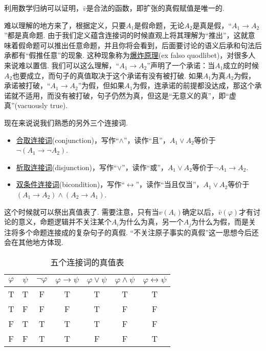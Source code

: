 \documentclass[main.tex]{subfiles}
\begin{document}
利用数学归纳可以证明，\(\bar v\)是合法的函数，即扩张的真假赋值是唯一的. 

\begin{note}
    难以理解的地方来了，根据定义，只要\(A_1\)是假命题，无论\(A_2\)是真是假，“\(A_1 \to A_2\)”都是真命题. 由于我们定义蕴含连接词的时候直观上将其理解为“推出”，这就意味着假命题可以推出任意命题，并且你将会看到，后面要讨论的语义后承和句法后承都有“假推任意”的现象. 这种现象称为\uline{爆炸原理}(ex falso quodlibet)，对很多人来说难以置信. 我们可以这么理解，“\(A_1 \to A_2\)”声明了一个承诺：当\(A_1\)成立的时候\(A_2\)也要成立，而句子的真值取决于这个承诺有没有被打破. 如果\(A_1\)为真\(A_2\)为假，承诺被打破，“\(A_1 \to A_2\)”为假，但如果\(A_1\)为假，连承诺的前提都没达成，那这个承诺就不适用，而没有被打破，句子仍然为真，但这是“无意义的真”，即“虚真”(vacuously true).
\end{note}

现在来说说我们熟悉的另外三个连接词.
\begin{itemize}
    \item \uline{合取连接词}(conjunction)，写作“\(\wedge\)”，读作“且”，\(A_1 \vee A_2\)等价于\(\neg (A_1 \to \neg A_2)\).
    \item \uline{析取连接词}(disjunction)，写作“\(\vee\)”，读作“或”，\(A_1 \vee A_2\)等价于\(\neg A_1 \to A_2\).
    \item \uline{双条件连接词}(bicondition)，写作“\(\leftrightarrow\)”，读作“当且仅当”，\(A_1 \vee A_2\)等价于\((A_1 \to A_2) \wedge (A_2 \to A_1)\).
\end{itemize}

这个时候就可以祭出真值表了. 需要注意，只有当\(v(A_i)\)确定以后，\(\bar v(\varphi)\)才有讨论的意义，命题逻辑并不关注某个\(A_i\)为什么为真，另一个\(A_j\)为什么为假，而是关注将多个命题连接成的复杂句子的真假. “不关注原子事实的真假”这一思想今后还会在其他地方体现.

\begin{table}[hbtp]
    \begin{center}
        \begin{tabular}{cc|ccccc}
            \hline
            \(\varphi\) & \(\psi\) & \(\neg \varphi\) & \(\varphi \to \psi\) & \(\varphi \vee \psi\) & \(\varphi \wedge \psi\) & \(\varphi \leftrightarrow \psi\) \\
            \hline
            T & T & F & T & T & T & T \\
            T & F & F & F & T & F & F \\
            F & T & T & T & T & F & F \\
            F & F & T & T & F & F & T \\
            \hline
        \end{tabular}
        \caption{五个连接词的真值表}
    \end{center}
\end{table}
\end{document}
